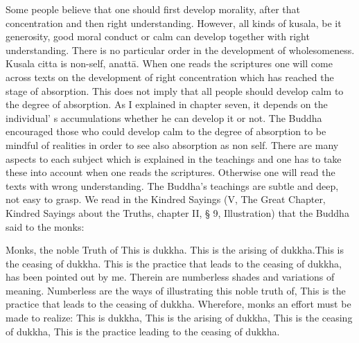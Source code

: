\documentclass{book}
\begin{document}
Some people believe that one should first develop morality, after that
concentration and then right under­standing. However, all kinds of
kusala, be it generosity, good moral conduct or calm can develop
together with right understanding. There is no particular order in the
development of wholesomeness. Kusala citta is non-self, anattā. When one
reads the scriptures one will come across texts on the development of
right concentration which has reached the stage of absorption. This does
not imply that all people should develop calm to the degree of
absorption. As I explained in chapter seven, it depends on the   individual' s accumulations whether he can develop it or not. The Buddha encouraged those who could develop calm to the degree of absorption to be mindful of realities in order to see also absorption as non self. There  are many aspects to each subject which is explained in the teachings and one has to take these into account when one reads the scriptures. 
Otherwise one will read the texts with wrong understanding. The Buddha's teachings are subtle and deep, not easy to grasp. We read in the Kindred Sayings (V, The Great Chapter, Kindred Sayings about the Truths, chapter II, § 9, Illustration) that the Buddha said to the monks:

Monks, the noble Truth of This is dukkha. This is the arising of
dukkha.This is the ceasing of dukkha. This is the practice that leads to
the ceasing of dukkha, has been pointed out by me. Therein are
numberless shades and variations of meaning. Numberless are the ways of
illustrating this noble truth of, This is the practice that leads to the
ceasing of dukkha. Wherefore, monks an effort must be made to realize:
This is dukkha, This is the arising of dukkha, This is the ceasing of
dukkha, This is the practice leading to the ceasing of dukkha.
\end{document}

